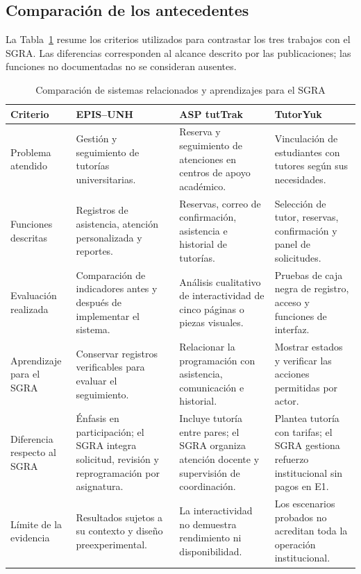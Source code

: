 \subsection{Comparación de los antecedentes}

La Tabla~\ref{tab:comparacion-relacionados} resume los criterios utilizados para contrastar los tres trabajos con el SGRA. Las diferencias corresponden al alcance descrito por las publicaciones; las funciones no documentadas no se consideran ausentes.

\begin{table}[htbp]
\centering
\caption{Comparación de sistemas relacionados y aprendizajes para el SGRA}
\label{tab:comparacion-relacionados}
\small
\renewcommand{\arraystretch}{1.18}
\begin{tabularx}{\textwidth}{@{}>{\raggedright\arraybackslash}p{}*{3}{>{\raggedright\arraybackslash}X}@{}}
\toprule
\textbf{Criterio} & \textbf{EPIS--UNH}~\cite{Rojas2023} & \textbf{ASP tutTrak}~\cite{grigoryan2024-tuttrak} & \textbf{TutorYuk}~\cite{seah2023-tutoryuk} \\
\midrule
Problema atendido &
Gestión y seguimiento de tutorías universitarias. &
Reserva y seguimiento de atenciones en centros de apoyo académico. &
Vinculación de estudiantes con tutores según sus necesidades. \\
\addlinespace
Funciones descritas &
Registros de asistencia, atención personalizada y reportes. &
Reservas, correo de confirmación, asistencia e historial de tutorías. &
Selección de tutor, reservas, confirmación y panel de solicitudes. \\
\addlinespace
Evaluación realizada &
Comparación de indicadores antes y después de implementar el sistema. &
Análisis cualitativo de interactividad de cinco páginas o piezas visuales. &
Pruebas de caja negra de registro, acceso y funciones de interfaz. \\
\addlinespace
Aprendizaje para el SGRA &
Conservar registros verificables para evaluar el seguimiento. &
Relacionar la programación con asistencia, comunicación e historial. &
Mostrar estados y verificar las acciones permitidas por actor. \\
\addlinespace
Diferencia respecto al SGRA &
Énfasis en participación; el SGRA integra solicitud, revisión y reprogramación por asignatura. &
Incluye tutoría entre pares; el SGRA organiza atención docente y supervisión de coordinación. &
Plantea tutoría con tarifas; el SGRA gestiona refuerzo institucional sin pagos en E1. \\
\addlinespace
Límite de la evidencia &
Resultados sujetos a su contexto y diseño preexperimental. &
La interactividad no demuestra rendimiento ni disponibilidad. &
Los escenarios probados no acreditan toda la operación institucional. \\
\bottomrule
\end{tabularx}
\end{table}

